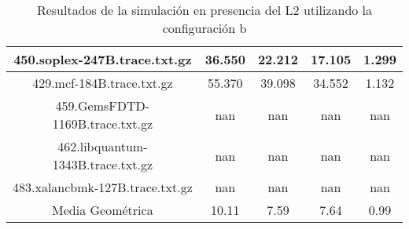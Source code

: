 \begin{table}[H]
\begin{tabular}{|c|c|c|c|c|}
450.soplex-247B.trace.txt.gz & 36.550 & 22.212 &  17.105 & 1.299\\\hline
429.mcf-184B.trace.txt.gz & 55.370 & 39.098 &  34.552 & 1.132\\\hline
459.GemsFDTD-1169B.trace.txt.gz & nan & nan &  nan & nan\\\hline
462.libquantum-1343B.trace.txt.gz & nan & nan &  nan & nan\\\hline
483.xalancbmk-127B.trace.txt.gz & nan & nan &  nan & nan\\\hline
Media Geométrica & 10.11 & 7.59& 7.64 & 0.99\\\hline
\end{tabular}
\caption{Resultados de la simulación en presencia del L2 utilizando la configuración b}
\label{tab:amatL3b}
\end{table}